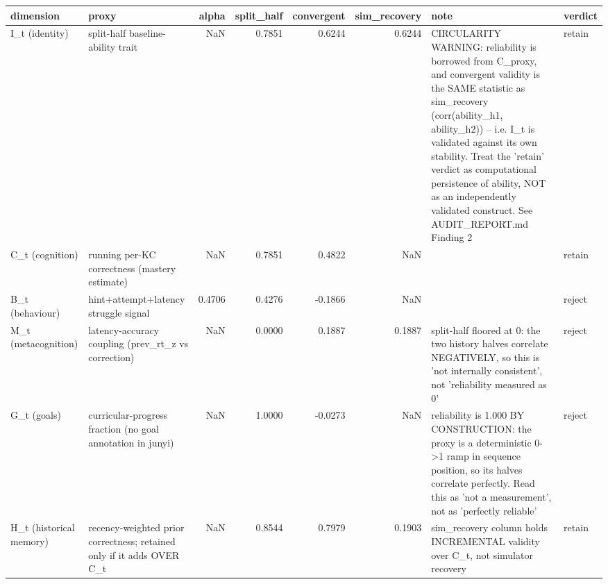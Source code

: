 \begin{tabular}{llrrrrll}
\toprule
dimension & proxy & alpha & split\_half & convergent & sim\_recovery & note & verdict \\
\midrule
I\_t (identity) & split-half baseline-ability trait & NaN & 0.7851 & 0.6244 & 0.6244 & CIRCULARITY WARNING: reliability is borrowed from C\_proxy, and convergent validity is the SAME statistic as sim\_recovery (corr(ability\_h1, ability\_h2)) -- i.e. I\_t is validated against its own stability. Treat the 'retain' verdict as computational persistence of ability, NOT as an independently validated construct. See AUDIT\_REPORT.md Finding 2 & retain \\
C\_t (cognition) & running per-KC correctness (mastery estimate) & NaN & 0.7851 & 0.4822 & NaN &  & retain \\
B\_t (behaviour) & hint+attempt+latency struggle signal & 0.4706 & 0.4276 & -0.1866 & NaN &  & reject \\
M\_t (metacognition) & latency-accuracy coupling (prev\_rt\_z vs correction) & NaN & 0.0000 & 0.1887 & 0.1887 & split-half floored at 0: the two history halves correlate NEGATIVELY, so this is 'not internally consistent', not 'reliability measured as 0' & reject \\
G\_t (goals) & curricular-progress fraction (no goal annotation in junyi) & NaN & 1.0000 & -0.0273 & NaN & reliability is 1.000 BY CONSTRUCTION: the proxy is a deterministic 0->1 ramp in sequence position, so its halves correlate perfectly. Read this as 'not a measurement', not as 'perfectly reliable' & reject \\
H\_t (historical memory) & recency-weighted prior correctness; retained only if it adds OVER C\_t & NaN & 0.8544 & 0.7979 & 0.1903 & sim\_recovery column holds INCREMENTAL validity over C\_t, not simulator recovery & retain \\
\bottomrule
\end{tabular}
